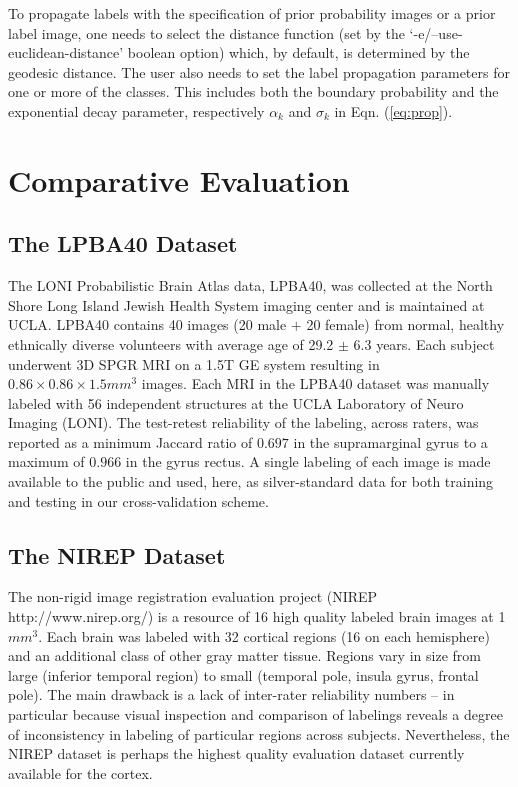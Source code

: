 \documentclass[11pt,english]{article}
\begin{document}
To propagate labels with the specification of prior probability images or a prior label image, one needs to select the distance function (set by the `{\ttfamily -e/--use-euclidean-distance}' boolean option) which, by default, is determined by the geodesic distance.  The user also needs to set the label propagation parameters for one or more of the classes.  This  includes both the boundary probability and the exponential decay parameter, respectively $\alpha_k$ and $\sigma_k$ in Eqn. (\ref{eq:prop}).  

\section{Comparative Evaluation}

{\color{red}{\em Brian, John}}

\subsection{The LPBA40 Dataset}  
\label{sec:lpba}
The LONI Probabilistic Brain Atlas data, LPBA40, \citep{Shattuck2008} was collected at the North Shore Long
Island Jewish Health System imaging center and is maintained at UCLA.
LPBA40 contains 40 images (20 male $+$ 20 female) from normal, healthy
ethnically diverse volunteers with average age of 29.2 $\pm$ 6.3
years.  Each subject underwent 3D SPGR MRI on a 1.5T GE system
resulting in $0.86 \times 0.86 \times 1.5 mm^3$ images.  Each MRI in
the LPBA40 dataset was manually labeled with 56 independent structures
at the UCLA Laboratory of Neuro Imaging (LONI).  The test-retest
reliability of the labeling, across raters, was reported as a minimum
Jaccard ratio of $0.697$ in the supramarginal gyrus to a maximum of
$0.966$ in the gyrus rectus.  A single labeling of each image is made
available to the public and used, here, as silver-standard data 
for both training and testing in our cross-validation scheme. 

\subsection{The NIREP Dataset}  
The non-rigid image registration evaluation project (NIREP
http://www.nirep.org/) is a resource of 16 high quality labeled brain
images at 1$mm^3$.  Each brain was labeled with 32 cortical regions
(16 on each hemisphere) and an additional class of other gray matter
tissue.  Regions vary in size from large (inferior temporal region) to
small (temporal pole, insula gyrus, frontal pole).  The main drawback
is a lack of inter-rater reliability numbers -- in particular because
visual inspection and comparison of labelings reveals a degree of
inconsistency in labeling of particular regions across subjects.
Nevertheless, the NIREP dataset is perhaps the highest quality
evaluation dataset currently available for the cortex. 
\end{document}
